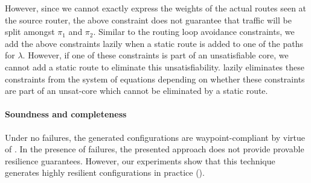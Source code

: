 However, since we cannot exactly express the weights of the actual routes seen 
at the source router, the above constraint does not  guarantee 
that traffic will be split amongst
$\pi_1$ and $\pi_2$. 
Similar to the routing loop avoidance constraints, we add the
above constraints lazily when a static route is added to one of the
paths for $\lambda$. However, if one of these constraints is part of 
an unsatisfiable core, we cannot add a static route to eliminate 
this unsatisfiability. \name lazily eliminates these constraints from the
system of equations depending on whether these constraints are part of 
an unsat-core which cannot be eliminated by a static route. 

\paragraph{Soundness and completeness}
Under no failures, the generated configurations are
waypoint-compliant by virtue of .
In the presence of failures, the presented approach does not provide provable resilience guarantees.
However,  our experiments show that
this technique generates highly resilient configurations 
in practice (). 

